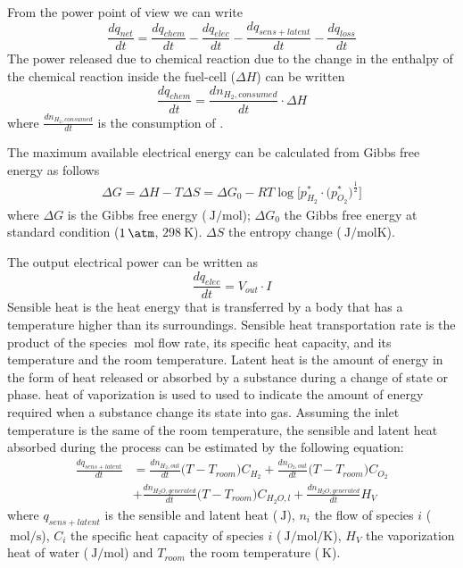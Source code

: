 \documentclass[12pt,a4paper]{scrartcl}
\begin{document}
\begin{onehalfspace}
\begin{enumerate}
	From the power point of view we can write
	\begin{equation}\label{eq38}
		\frac{dq_{net}}{dt} = \frac{dq_{chem}}{dt} - \frac{dq_{elec}}{dt} - \frac{dq_{sens+latent}}{dt} - \frac{dq_{loss}}{dt}
	\end{equation}
	The power released due to chemical reaction due to the change in the enthalpy of the chemical reaction inside the fuel-cell ($\Delta H$) can be written
	\begin{equation}\label{eq39}
		\frac{dq_{chem}}{dt} = \frac{dn_{H_2,consumed}}{dt}\cdot\Delta H
	\end{equation}
where $\frac{dn_{H_2,consumed}}{dt}$ is the consumption of . 

The maximum available electrical energy can be calculated from Gibbs free energy as follows
\begin{equation}\label{eq40}
	\begin{aligned}
		\Delta G = \Delta H - T\Delta S = \Delta G_0 -RT \log \Bigg[{p_{H_2}^*\cdot\Big(p_{O_2}^*\Big)^{\frac{1}{2}}}\Bigg]
	\end{aligned}
\end{equation}
where $\Delta G$ is the Gibbs free energy ($\SI{}{\joule\per\mole}$); $\Delta G_0$ the Gibbs free energy at standard condition ($\SI{1}{\atm}$, $\SI{298}{\kelvin}$). $\Delta S$ the entropy change ($\SI{}{\joule\per\mole\kelvin}$).

The output electrical power can be written as
\begin{equation}\label{eq41}
	\frac{dq_{elec}}{dt} = V_{out}\cdot I
\end{equation}
Sensible heat is the heat energy that is transferred by a body that has a temperature higher than its surroundings. Sensible heat transportation rate is the product of the species $\SI{}{\mole}$ flow rate, its specific heat capacity, and its temperature and the room temperature. Latent heat is the amount of energy in the form of heat released or absorbed by a substance during a change of state or phase. heat of vaporization is used to used to indicate the amount of energy required when a substance change its state into gas. Assuming the inlet temperature is the same of the room temperature, the sensible and latent heat absorbed during the process can be estimated by the following equation:
\begin{equation}\label{eq42}
	\begin{aligned}
	\frac{dq_{sens+latent}}{dt} &= \frac{dn_{H_2,out}}{dt}\Big(T-T_{room}\Big)C_{H_2}+\frac{dn_{O_2,out}}{dt}\Big(T-T_{room}\Big)C_{O_2}\\[6pt] &+\frac{dn_{H_2O,generated}}{dt}\Big(T-T_{room}\Big)C_{H_2O,l}+\frac{dn_{H_2O,generated}}{dt}H_V
	\end{aligned}
\end{equation}
where $q_{sens+latent}$ is the sensible and latent heat ($\SI{}{\joule}$), $n_i$ the flow of species $i$ ($\SI{}{\mole\per\second}$), $C_i$ the specific heat capacity of species $i$ ($\SI{}{\joule\per\mole\per\kelvin}$), $H_V$ the vaporization heat of water ($\SI{}{\joule\per\mole}$) and $T_{room}$ the room temperature ($\SI{}{\kelvin}$). 


\end{enumerate}
\end{onehalfspace}
\end{document}
